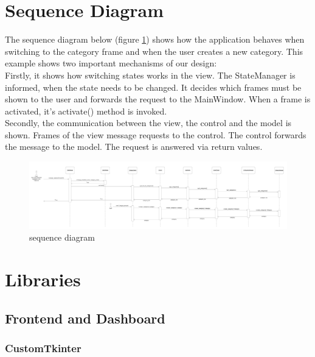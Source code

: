 \documentclass[parskip=full]{scrartcl} %
\begin{document}
\newpage

\section{Sequence Diagram}
The sequence diagram below (figure \ref{fig:sequencediagram}) shows how the application behaves when switching to the category frame and when the user creates a new category. This example shows two important mechanisms of our design:\\
Firstly, it shows how switching states works in the view. The StateManager is informed, when the state needs to be changed. It decides which frames must be shown to the user and forwards the request to the MainWindow. When a frame is activated, it's activate() method is invoked. \\
Secondly, the communication between the view, the control and the model is shown. Frames of the view message requests to the control. The control forwards the message to the model. The request is answered via return values.

\newpage

\begin{figure}
\centering
\includegraphics[width=1\textwidth]
        {pictures/sequenzdiagramm.png}
  \caption{sequence diagram}
  \label{fig:sequencediagram}
\end{figure}


\newpage



\section{Libraries}

\subsection{Frontend and Dashboard}

\subsubsection{CustomTkinter}
\end{document}
